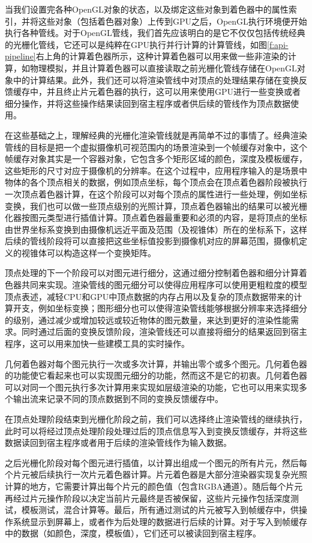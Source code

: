 当我们设置完各种OpenGL对象的状态，以及绑定这些对象到着色器中的属性索引，并将这些对象（包括着色器对象）上传到GPU之后，OpenGL执行环境便开始执行各种管线。对于OpenGL管线，我们首先应该明白的是它不仅仅包括传统经典的光栅化管线，它还可以是纯粹在GPU执行并行计算的计算管线，如图\ref{f:api-pipeline}右上角的计算着色器所示，这种计算着色器可以用来做一些非渲染的计算，如物理模拟，并且计算着色器可以直接读取之前光栅化管线存储在OpenGL对象中的计算结果。此外，我们还可以将渲染管线中对顶点的处理结果存储在变换反馈缓存中，并且终止片元着色器的执行，这可以用来使用GPU进行一些变换或者细分操作，并将这些操作结果读回到宿主程序或者供后续的管线作为顶点数据使用。

在这些基础之上，理解经典的光栅化渲染管线就是再简单不过的事情了。经典渲染管线的目标是把一个虚拟摄像机可视范围内的场景渲染到一个帧缓存对象中，这个帧缓存对象其实是一个容器对象，它包含多个矩形区域的颜色，深度及模板缓存，这些矩形的尺寸对应于摄像机的分辨率。在这个过程中，应用程序输入的是场景中物体的各个顶点相关的数据，例如顶点坐标，每个顶点会在顶点着色器阶段被执行一次顶点着色器计算，在这个阶段可以对每个顶点的属性进行一些处理，例如坐标变换，我们也可以做一些顶点级别的光照计算，顶点着色器输出的结果可以被光栅化器按图元类型进行插值计算。顶点着色器最重要和必须的内容，是将顶点的坐标由世界坐标系变换到由摄像机远近平面及范围（及视锥体）所在的坐标系下，这样后续的管线阶段将可以直接把这些坐标值投影到摄像机对应的屏幕范围，摄像机定义的视锥体可以构造这样一个变换矩阵。

顶点处理的下一个阶段可以对图元进行细分，这通过细分控制着色器和细分计算着色器共同来实现。渲染管线的图元细分可以使得应用程序可以使用更粗粒度的模型顶点表述，减轻CPU和GPU中顶点数据的内存占用以及复杂的顶点数据带来的计算开支，例如坐标变换；图形细分也可以使得渲染管线能够根据分辨率来选择细分的级别，通过减少或增加较远或较近物体的图元数量，来达到更好的渲染性能需求。同时通过后面的变换反馈阶段，渲染管线还可以直接将细分的结果返回到宿主程序，这可以用来加快一些建模工具的实时操作。

几何着色器对每个图元执行一次或多次计算，并输出零个或多个图元。几何着色器的功能使它看起来也可以实现图元细分的功能，然而这不是它的初衷。几何着色器可以对同一个图元执行多次计算用来实现如层级渲染的功能，它也可以用来实现多个输出流来记录不同的顶点数据到不同的变换反馈缓存中。

在顶点处理阶段结束到光栅化阶段之前，我们可以选择终止渲染管线的继续执行，此时可以将经过顶点处理阶段处理过后的顶点信息写入到变换反馈缓存，并将这些数据读回到宿主程序或者用于后续的渲染管线作为输入数据。

之后光栅化阶段对每个图元进行插值，以计算出组成一个图元的所有片元，然后每个片元被后续执行一次片元着色器计算。片元着色器是大部分渲染器实现复杂光照计算的地方，它需要计算出每个片元的颜色值（包含RGBA通道）。随后每个片元再经过片元操作阶段以决定当前片元最终是否被保留，这些片元操作包括深度测试，模板测试，混合计算等。最后，所有通过测试的片元被写入到帧缓存中，供操作系统显示到屏幕上，或者作为后处理的数据进行后续的计算。对于写入到帧缓存中的数据（如颜色，深度，模板值），它们还可以被读回到宿主程序。

